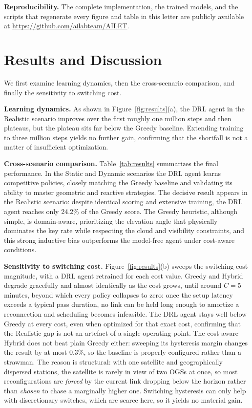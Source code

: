 \documentclass[manuscript, review, nonacm]{acmart}
\newcommand{\DRLrealRel}{24.2\%}
\newcommand{\CollapseCost}{5}
\begin{document}
\noindent\textbf{Reproducibility.} The complete implementation, the trained models, and the scripts that regenerate every figure and table in this letter are publicly available at \url{https://github.com/ailabteam/AILET}.

\section{Results and Discussion}\label{sec:results}
We first examine learning dynamics, then the cross-scenario comparison, and finally the sensitivity to switching cost.

\textbf{Learning dynamics.} As shown in Figure~\ref{fig:results}(a), the DRL agent in the Realistic scenario improves over the first roughly one million steps and then plateaus, but the plateau sits far below the Greedy baseline. Extending training to three million steps yields no further gain, confirming that the shortfall is not a matter of insufficient optimization.

\textbf{Cross-scenario comparison.} Table~\ref{tab:results} summarizes the final performance. In the Static and Dynamic scenarios the DRL agent learns competitive policies, closely matching the Greedy baseline and validating its ability to master geometric and reactive strategies. The decisive result appears in the Realistic scenario: despite identical scoring and extensive training, the DRL agent reaches only \DRLrealRel{} of the Greedy score. The Greedy heuristic, although simple, is domain-aware, prioritizing the elevation angle that physically dominates the key rate while respecting the cloud and visibility constraints, and this strong inductive bias outperforms the model-free agent under cost-aware conditions.

\textbf{Sensitivity to switching cost.} Figure~\ref{fig:results}(b) sweeps the switching-cost magnitude, with a DRL agent retrained for each cost value. Greedy and Hybrid degrade gracefully and almost identically as the cost grows, until around $C = \CollapseCost$ minutes, beyond which every policy collapses to zero: once the setup latency exceeds a typical pass duration, no link can be held long enough to amortize a reconnection and scheduling becomes infeasible. The DRL agent stays well below Greedy at every cost, even when optimized for that exact cost, confirming that the Realistic gap is not an artefact of a single operating point. The cost-aware Hybrid does not beat plain Greedy either: sweeping its hysteresis margin changes the result by at most $0.3\%$, so the baseline is properly configured rather than a strawman. The reason is structural: with one satellite and geographically dispersed stations, the satellite is rarely in view of two OGSs at once, so most reconfigurations are \emph{forced} by the current link dropping below the horizon rather than \emph{chosen} to chase a marginally higher one. Switching hysteresis can only help with discretionary switches, which are scarce here, so it yields no material gain.
\end{document}
